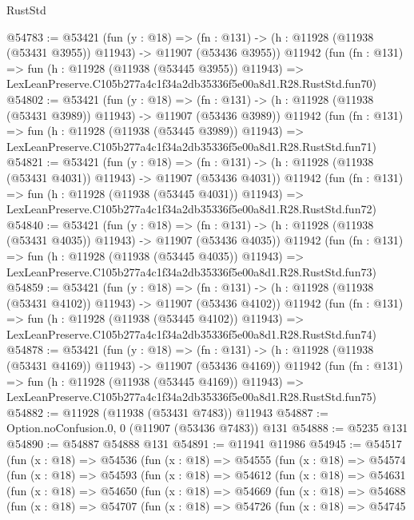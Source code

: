 \begin{lexlean}{RustStd}
\begin{coremodule}
@54783 := @53421
    (fun (y : @18) =>
    (fn : @131) -> (h : @11928 (@11938 (@53431 @3955)) @11943) -> @11907 (@53436 @3955))
    @11942
    (fun (fn : @131) =>
    fun (h : @11928 (@11938 (@53445 @3955)) @11943) =>
    LexLeanPreserve.C105b277a4c1f34a2db35336f5e00a8d1.R28.RustStd.fun70)
@54802 := @53421
    (fun (y : @18) =>
    (fn : @131) -> (h : @11928 (@11938 (@53431 @3989)) @11943) -> @11907 (@53436 @3989))
    @11942
    (fun (fn : @131) =>
    fun (h : @11928 (@11938 (@53445 @3989)) @11943) =>
    LexLeanPreserve.C105b277a4c1f34a2db35336f5e00a8d1.R28.RustStd.fun71)
@54821 := @53421
    (fun (y : @18) =>
    (fn : @131) -> (h : @11928 (@11938 (@53431 @4031)) @11943) -> @11907 (@53436 @4031))
    @11942
    (fun (fn : @131) =>
    fun (h : @11928 (@11938 (@53445 @4031)) @11943) =>
    LexLeanPreserve.C105b277a4c1f34a2db35336f5e00a8d1.R28.RustStd.fun72)
@54840 := @53421
    (fun (y : @18) =>
    (fn : @131) -> (h : @11928 (@11938 (@53431 @4035)) @11943) -> @11907 (@53436 @4035))
    @11942
    (fun (fn : @131) =>
    fun (h : @11928 (@11938 (@53445 @4035)) @11943) =>
    LexLeanPreserve.C105b277a4c1f34a2db35336f5e00a8d1.R28.RustStd.fun73)
@54859 := @53421
    (fun (y : @18) =>
    (fn : @131) -> (h : @11928 (@11938 (@53431 @4102)) @11943) -> @11907 (@53436 @4102))
    @11942
    (fun (fn : @131) =>
    fun (h : @11928 (@11938 (@53445 @4102)) @11943) =>
    LexLeanPreserve.C105b277a4c1f34a2db35336f5e00a8d1.R28.RustStd.fun74)
@54878 := @53421
    (fun (y : @18) =>
    (fn : @131) -> (h : @11928 (@11938 (@53431 @4169)) @11943) -> @11907 (@53436 @4169))
    @11942
    (fun (fn : @131) =>
    fun (h : @11928 (@11938 (@53445 @4169)) @11943) =>
    LexLeanPreserve.C105b277a4c1f34a2db35336f5e00a8d1.R28.RustStd.fun75)
@54882 := @11928 (@11938 (@53431 @7483)) @11943
@54887 := Option.noConfusion.{0, 0} (@11907 (@53436 @7483)) @131
@54888 := @5235 @131
@54890 := @54887 @54888 @131
@54891 := @11941 @11986
@54945 := @54517
    (fun (x : @18) =>
    @54536
      (fun (x : @18) =>
      @54555
        (fun (x : @18) =>
        @54574
          (fun (x : @18) =>
          @54593
            (fun (x : @18) =>
            @54612
              (fun (x : @18) =>
              @54631
                (fun (x : @18) =>
                @54650
                  (fun (x : @18) =>
                  @54669
                    (fun (x : @18) =>
                    @54688
                      (fun (x : @18) =>
                      @54707
                        (fun (x : @18) =>
                        @54726
                          (fun (x : @18) =>
                          @54745

\end{coremodule}
\end{lexlean}
